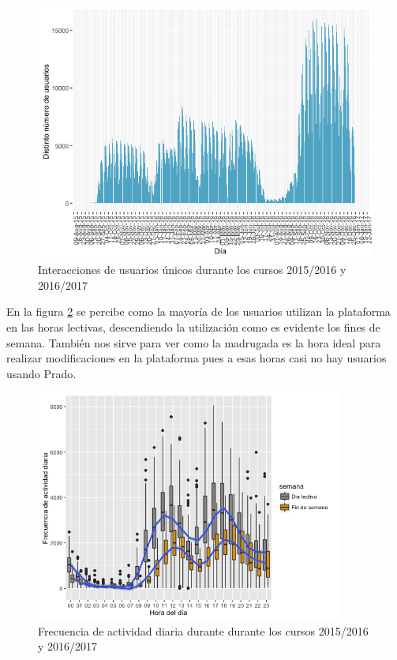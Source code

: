 \begin{figure}[H]
\centering
\includegraphics[width=1.1\textwidth]{../r/distintonumerousuarios}
\caption{Interacciones de usuarios únicos durante los cursos 2015/2016 y 2016/2017}
\label{fig:distintonumerousuarios}
\end{figure}



En la figura \ref{fig:frecuenciaactividaddiaria} se percibe como la mayoría de los usuarios utilizan la plataforma en las horas lectivas, descendiendo la utilización como es evidente los fines de semana. También nos sirve para ver como la madrugada es la hora ideal para realizar modificaciones en la plataforma pues a esas horas casi no hay usuarios usando Prado.

\begin{figure}[H]
\centering
\includegraphics[width=0.9\textwidth]{../r/frecuenciaactividaddiaria}
\caption{Frecuencia de actividad diaria durante durante los cursos 2015/2016 y 2016/2017}
\label{fig:frecuenciaactividaddiaria}
\end{figure}

